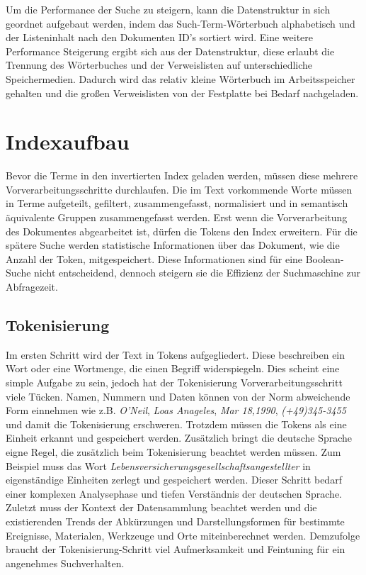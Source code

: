 \pagebreak 
Um die Performance der Suche zu steigern, kann die Datenstruktur in sich
geordnet aufgebaut werden, indem das Such-Term-Wörterbuch alphabetisch
und der Listeninhalt nach den Dokumenten ID’s sortiert wird. Eine
weitere Performance Steigerung ergibt sich aus der Datenstruktur, diese
erlaubt die Trennung des Wörterbuches und der Verweislisten auf
unterschiedliche Speichermedien. Dadurch wird das relativ kleine
Wörterbuch im Arbeitsspeicher gehalten und die großen Verweislisten von
der Festplatte bei Bedarf nachgeladen.

\section[Indexaufbau ]{Indexaufbau }
Bevor die Terme in den invertierten Index geladen werden, müssen diese
mehrere Vorverarbeitungsschritte durchlaufen. Die im Text vorkommende
Worte müssen in Terme aufgeteilt, gefiltert, zusammengefasst,
normalisiert und in semantisch äquivalente Gruppen zusammengefasst
werden. Erst wenn die Vorverarbeitung des Dokumentes abgearbeitet ist,
dürfen die Tokens den Index erweitern. 
\newline
Für die spätere Suche werden statistische Informationen über das
Dokument, %
wie die Anzahl der Token, mitgespeichert.
\newline
Diese Informationen sind für eine Boolean-Suche nicht entscheidend,
dennoch steigern sie die Effizienz der Suchmaschine zur Abfragezeit.

\subsection[Tokenisierung]{Tokenisierung}
Im ersten Schritt wird der Text in Tokens aufgegliedert. Diese
beschreiben ein Wort oder eine Wortmenge, die einen Begriff
widerspiegeln. Dies scheint eine simple Aufgabe zu sein, jedoch hat der
Tokenisierung Vorverarbeitungsschritt viele Tücken. 
\bigbreak
Namen, Nummern und Daten können von der Norm abweichende Form einnehmen
wie z.B. \textit{O'Neil}, \textit{Loas Anageles}, \textit{Mar 18,1990},
\textit{(+49)345-3455} und damit die Tokenisierung erschweren. Trotzdem müssen
die Tokens als eine Einheit erkannt und gespeichert werden. 
\newline
Zusätzlich bringt die deutsche Sprache eigne Regel, die zusätzlich beim
Tokenisierung beachtet werden müssen. Zum Beispiel muss das Wort
\textit{Lebensversicherungsgesellschaftsangestellter} in
eigenständige Einheiten zerlegt und gespeichert werden. Dieser Schritt
bedarf einer komplexen Analysephase und tiefen Verständnis der
deutschen Sprache. 
\newline
Zuletzt muss der Kontext der Datensammlung beachtet werden und die
existierenden Trends der Abkürzungen und Darstellungsformen für
bestimmte Ereignisse, Materialen, Werkzeuge und Orte miteinberechnet
werden.
\bigbreak
Demzufolge braucht der Tokenisierung-Schritt viel Aufmerksamkeit und
Feintuning für ein angenehmes Suchverhalten. \ 

